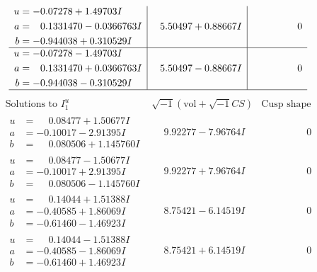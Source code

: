\documentclass[1p]{elsarticle_modified}
\theoremstyle{definition}
\newcommand{\I}{\sqrt{-1}}
\begin{document}
$$\begin{array}{c|c|c}
\begin{aligned}
u &= -0.07278 + 1.49703 I \\
a &= \phantom{-}0.1331470 - 0.0366763 I \\
b &= -0.944038 + 0.310529 I\end{aligned}
 & \phantom{-}5.50497 + 0.88667 I & \phantom{-0.000000 } 0 \\ \hline\begin{aligned}
u &= -0.07278 - 1.49703 I \\
a &= \phantom{-}0.1331470 + 0.0366763 I \\
b &= -0.944038 - 0.310529 I\end{aligned}
 & \phantom{-}5.50497 - 0.88667 I & \phantom{-0.000000 } 0\\
 \hline 
 \end{array}$$\newpage$$\begin{array}{c|c|c}  
\text{Solutions to }I^u_{1}& \I (\text{vol} + \sqrt{-1}CS) & \text{Cusp shape}\\
 \hline 
\begin{aligned}
u &= \phantom{-}0.08477 + 1.50677 I \\
a &= -0.10017 - 2.91395 I \\
b &= \phantom{-}0.080506 + 1.145760 I\end{aligned}
 & \phantom{-}9.92277 - 7.96764 I & \phantom{-0.000000 } 0 \\ \hline\begin{aligned}
u &= \phantom{-}0.08477 - 1.50677 I \\
a &= -0.10017 + 2.91395 I \\
b &= \phantom{-}0.080506 - 1.145760 I\end{aligned}
 & \phantom{-}9.92277 + 7.96764 I & \phantom{-0.000000 } 0 \\ \hline\begin{aligned}
u &= \phantom{-}0.14044 + 1.51388 I \\
a &= -0.40585 + 1.86069 I \\
b &= -0.61460 - 1.46923 I\end{aligned}
 & \phantom{-}8.75421 - 6.14519 I & \phantom{-0.000000 } 0 \\ \hline\begin{aligned}
u &= \phantom{-}0.14044 - 1.51388 I \\
a &= -0.40585 - 1.86069 I \\
b &= -0.61460 + 1.46923 I\end{aligned}
 & \phantom{-}8.75421 + 6.14519 I & \phantom{-0.000000 } 0 \\ \hline\begin{aligned}

\end{aligned}
\end{array}$$
\end{document}
